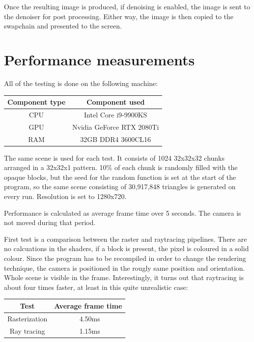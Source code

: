 \documentclass[times, utf8, zavrsni, numeric]{fer}
\begin{document}
Once the resulting image is produced, if denoising is enabled, the image is sent to the denoiser for post processing. Either way, the image is then copied to the swapchain and presented to the screen.

\section{Performance measurements}
All of the testing is done on the following machine:
\begin{center}
\begin{tabular}{|c|c|}
	\hline
	Component type & Component used \\
	\hline
	CPU & Intel Core i9-9900KS            \\
	\hline
	GPU & Nvidia GeForce RTX 2080Ti   \\
	\hline
	RAM & 32GB DDR4 3600CL16         \\
	\hline
\end{tabular}
\end{center}

The same scene is used for each test. It consists of 1024 32x32x32 chunks arranged in a 32x32x1 pattern. 10\% of each chunk is randomly filled with the opaque blocks, but the seed for the random function is set at the start of the program, so the same scene consisting of 30,917,848 triangles is generated on every run. Resolution is set to 1280x720.

Performance is calculated as average frame time over 5 seconds. The camera is not moved during that period.

First test is a comparison between the raster and raytracing pipelines. There are no calcuations in the shaders, if a block is present, the pixel is coloured in a solid colour. Since the program has to be recompiled in order to change the rendering technique, the camera is positioned in the rougly same position and orientation. Whole scene is visible in the frame. Interestingly, it turns out that raytracing is about four times faster, at least in this quite unrealistic case:
\begin{center}
\begin{tabular}{|c|c|}
	\hline
	Test & Average frame time \\
	\hline
	Rasterization & ~4.50ms \\
	\hline
	Ray tracing & ~1.15ms \\
	\hline
\end{tabular}
\end{center}
\end{document}
